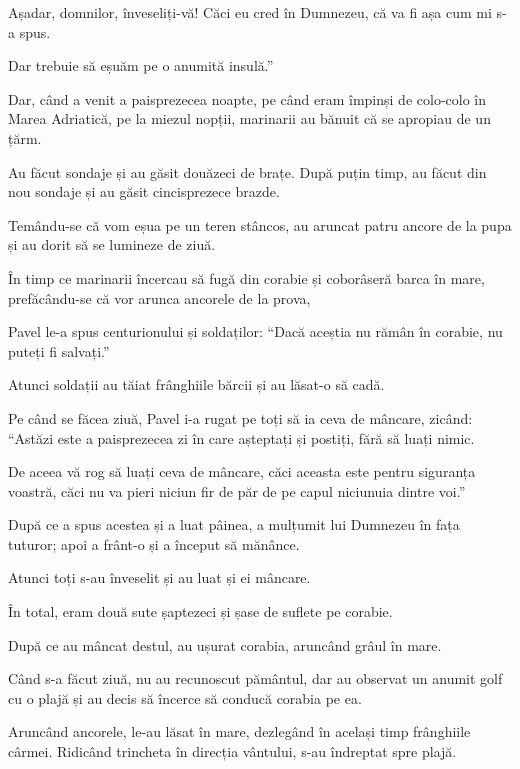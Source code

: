 {Așadar, domnilor, înveseliți-vă! Căci eu cred în Dumnezeu, că va fi așa cum mi s-a spus.

Dar trebuie să eșuăm pe o anumită insulă.”


\par }{\PP {}Dar, când a venit a paisprezecea noapte, pe când eram împinși de colo-colo în Marea Adriatică, pe la miezul nopții, marinarii au bănuit că se apropiau de un țărm.

Au făcut sondaje și au găsit douăzeci de brațe. După puțin timp, au făcut din nou sondaje și au găsit cincisprezece brazde.

Temându-se că vom eșua pe un teren stâncos, au aruncat patru ancore de la pupa și au dorit să se lumineze de ziuă.

În timp ce marinarii încercau să fugă din corabie și coborâseră barca în mare, prefăcându-se că vor arunca ancorele de la prova,

Pavel le-a spus centurionului și soldaților: “Dacă aceștia nu rămân în corabie, nu puteți fi salvați.”

Atunci soldații au tăiat frânghiile bărcii și au lăsat-o să cadă.


\par }{\PP {}Pe când se făcea ziuă, Pavel i-a rugat pe toți să ia ceva de mâncare, zicând: “Astăzi este a paisprezecea zi în care așteptați și postiți, fără să luați nimic.

De aceea vă rog să luați ceva de mâncare, căci aceasta este pentru siguranța voastră, căci nu va pieri niciun fir de păr de pe capul niciunuia dintre voi.”

După ce a spus acestea și a luat pâinea, a mulțumit lui Dumnezeu în fața tuturor; apoi a frânt-o și a început să mănânce.

Atunci toți s-au înveselit și au luat și ei mâncare.

În total, eram două sute șaptezeci și șase de suflete pe corabie.

După ce au mâncat destul, au ușurat corabia, aruncând grâul în mare.

Când s-a făcut ziuă, nu au recunoscut pământul, dar au observat un anumit golf cu o plajă și au decis să încerce să conducă corabia pe ea.

Aruncând ancorele, le-au lăsat în mare, dezlegând în același timp frânghiile cârmei. Ridicând trincheta în direcția vântului, s-au îndreptat spre plajă.

}
